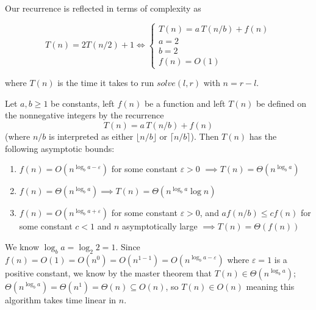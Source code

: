 {\newpage
Our recurrence is reflected in terms of complexity as

\begin{equation*}
    T(n) = 2T(n/2) + 1 \iff \begin{cases}
        T(n) = a\,T(n/b) + f(n) \\
        a = 2 \\
        b = 2 \\
        f(n) = O(1)
    \end{cases}
\end{equation*}

where $T(n)$ is the time it takes to run $solve(l, r)$ with $n = r-l$.

\begin{theorem}
    Let $a, b \geq 1$ be constants, left $f(n)$ be a function and left $T(n)$ be defined on the nonnegative integers by the recurrence
    \begin{equation*}
        T(n) = a\,T(n/b) + f(n)
    \end{equation*}
    (where $n/b$ is interpreted as either $\lfloor n/b \rfloor$ or $\lceil n/b \rceil$). Then $T(n)$ has the following asymptotic bounds:
    \begin{enumerate}
        \item $f(n) = O(n^{\log_b{a} - \varepsilon})$ for some constant $\varepsilon > 0$ $\implies T(n) = \Theta(n^{\log_b{a}})$
        \item $f(n) = \Theta(n^{\log_b{a}}) \implies T(n) = \Theta(n^{\log_b{a}} \log{n})$
        \item $f(n) = O(n^{\log_b{a} + \varepsilon})$ for some constant $\varepsilon > 0$, and $a f(n/b) \leq c f(n)$ for some constant $c < 1$ and $n$ asymptotically large $\implies T(n) = \Theta(f(n))$
    \end{enumerate}
\end{theorem}


We know $\log_b{a} = \log_2{2} = 1$. Since $f(n) = O(1) = O(n^0) = O(n^{1-1}) = O(n^{\log_b{a}-\varepsilon})$ where $\varepsilon = 1$ is a positive constant, we know by the master theorem that $T(n) \in \Theta (n^{\log_b{a}})$; $\Theta (n^{\log_b{a}}) = \Theta (n^1) = \Theta(n) \subseteq O(n)$, so $T(n) \in O(n)$ meaning this algorithm takes time linear in $n$.

\

}
